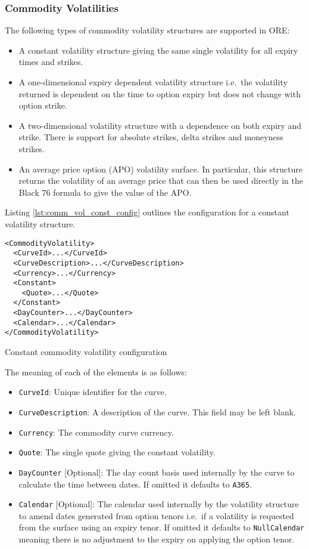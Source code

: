 \subsubsection{Commodity Volatilities}

The following types of commodity volatility structures are supported in ORE:
\begin{itemize}
\item A constant volatility structure giving the same single volatility for all expiry times and strikes.
\item A one-dimensional expiry dependent volatility structure i.e.\ the volatility returned is dependent on the time to option expiry but does not change with option strike.
\item A two-dimensional volatility structure with a dependence on both expiry and strike. There is support for absolute strikes, delta strikes and moneyness strikes.
\item An average price option (APO) volatility surface. In particular, this structure returns the volatility of an average price that can then be used directly in the Black 76 formula to give the value of the APO.
\end{itemize}

Listing \ref{lst:comm_vol_const_config} outlines the configuration for a constant volatility structure.

\begin{longlisting}
\begin{verbatim}
<CommodityVolatility>
  <CurveId>...</CurveId>
  <CurveDescription>...</CurveDescription>
  <Currency>...</Currency>
  <Constant>
    <Quote>...</Quote>
  </Constant>
  <DayCounter>...</DayCounter>
  <Calendar>...</Calendar>
</CommodityVolatility>
\end{verbatim}
\caption{Constant commodity volatility configuration}
\label{lst:comm_vol_const_config}
\end{longlisting}

The meaning of each of the elements is as follows:
\begin{itemize}
\item \lstinline!CurveId!: Unique identifier for the curve.
\item \lstinline!CurveDescription!: A description of the curve. This field may be left blank.
\item \lstinline!Currency!: The commodity curve currency.
\item \lstinline!Quote!: The single quote giving the constant volatility.
\item \lstinline!DayCounter! [Optional]: The day count basis used internally by the curve to calculate the time between dates. If omitted it defaults to \lstinline!A365!.
\item \lstinline!Calendar! [Optional]: The calendar used internally by the volatility structure to amend dates generated from option tenors i.e.\ if a volatility is requested from the surface using an expiry tenor. If omitted it defaults to \lstinline!NullCalendar! meaning there is no adjustment to the expiry on applying the option tenor.
\end{itemize}

